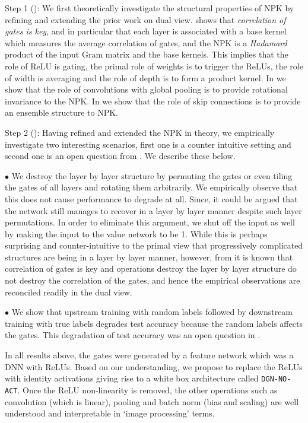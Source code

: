 \documentclass{article} %
\begin{document}
Step 1 (): We first theoretically investigate the structural properties of NPK by refining and extending the prior work on dual view.  shows that \emph{correlation of gates is key}, and in particular that each layer is associated with a base kernel which measures the average correlation of gates, and the NPK is a \emph{Hadamard} product of the input Gram matrix and the base kernels. This implies that the role of ReLU is gating, the primal role of weights is to trigger the ReLUs, the role of width is averaging and the role of depth is to form a product kernel. In  we show that the role of convolutions with global pooling is to provide rotational invariance to the NPK. In  we show that the role of skip connections is to provide an ensemble structure to NPK.

Step 2  (): Having refined and extended the NPK in theory, we empirically investigate two interesting scenarios, first one is a counter intuitive setting and second one is an open question from \cite{randlabel}. We describe these below.

\quad$\bullet$ We destroy the layer by layer structure by permuting the gates or even tiling the gates of all layers and rotating them arbitrarily. We empirically observe that this does not cause performance to degrade at all. Since, it could be argued that the network still manages to recover in a layer by layer manner despite such layer permutations. In order to eliminate this argument, we shut off the input as well by making the input to the value network to be 1. While this is perhaps surprising and counter-intuitive to the primal view that progressively complicated structures are being in a layer by layer manner, however, from  it is known that  correlation of gates is key and operations destroy the layer by layer structure do not destroy the correlation of the gates, and hence the empirical observations are reconciled readily in the dual view.

\quad$\bullet$ We show that upstream training with random labels followed by downstream training with true labels degrades test accuracy because the random labels affects the gates. This degradation of test accuracy was an open question in \cite{randlabel}.


In all results above, the gates were generated by a feature network which was a DNN with ReLUs.  Based on our understanding, we propose to replace the ReLUs with identity activations giving rise to a white box architecture called \texttt{DGN-NO-ACT}. Once the ReLU non-linearity is removed, the other operations such as convolution (which is  linear), pooling and batch norm (bias and scaling) are well understood and interpretable in `image processing' terms. 
\end{document}
